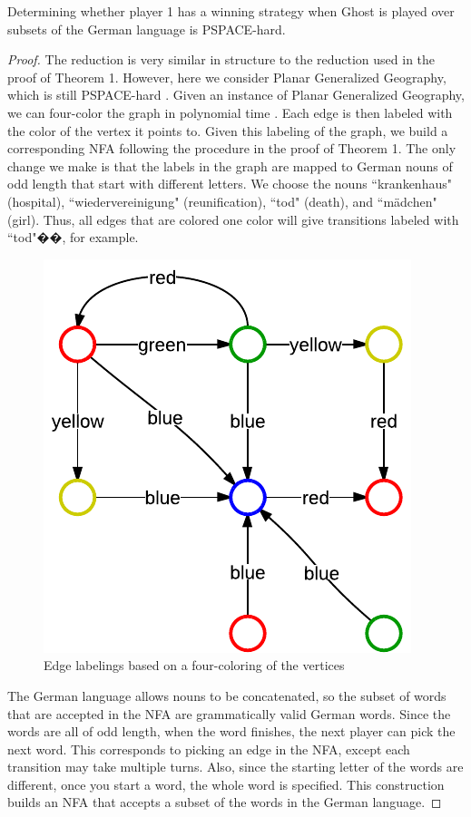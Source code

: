\documentclass[runningheads,a4paper]{llncs}
\begin{document}
\begin{theorem}Determining whether player 1 has a winning strategy when Ghost is played over subsets of the German language is PSPACE-hard.
\end{theorem}

\begin{proof} The reduction is very similar in structure to the reduction used in the proof of Theorem 1. However, here we consider Planar Generalized Geography, which is still PSPACE-hard \cite{Sipser}. Given an instance of Planar Generalized Geography, we can four-color the graph in polynomial time \cite{planargraph}. Each edge is then labeled with the color of the vertex it points to. Given this labeling of the graph, we build a corresponding NFA following the procedure in the proof of Theorem 1. The only change we make is that the labels in the graph are mapped to German nouns of odd length that start with different letters. We choose the nouns ``krankenhaus" (hospital), ``wiedervereinigung" (reunification), ``tod" (death), and ``m{\"a}dchen" (girl). Thus, all edges that are colored one color will give transitions labeled with ``tod"��, for example. 

\begin{figure}[ht]
\centering
\includegraphics[width=0.4\linewidth]{Ghost3.pdf}
\caption{Edge labelings based on a four-coloring of the vertices}
\label{fig:reduction}
\end{figure}

	The German language allows nouns to be concatenated, so the subset of words that are accepted in the NFA are grammatically valid German words. Since the words are all of odd length, when the word finishes, the next player can pick the next word. This corresponds to picking an edge in the NFA, except each transition may take multiple turns. Also, since the starting letter of the words are different, once you start a word, the whole word is specified. This construction builds an NFA that accepts a subset of the words in the German language. 
\end{proof}
\end{document}
